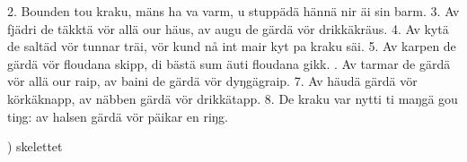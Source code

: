 \setlength{\columnsep}{0.2cm}
\begin{multicols}{2}
2.  Bounden tou kraku, mäns ha va varm,
    u stuppädä hännä nir äi sin barm.
3.  Av fjädri de täkktä vör allä our häus,
    av augu de gärdä vör drikkäkräus.
4.  Av kytä de saltäd vör tunnar träi,
    vör kund nå int mair kyt pa kraku säi.
5.  Av karpen de gärdä vör floudana skipp,
    di bästä sum äuti floudana gikk.
\vfill{}.  Av tarmar de gärdä vör allä our raip,
    av baini de gärdä vör dyŋgägraip.
7.  Av häudä gärdä vör körkäknapp,
    av näbben gärdä vör drikkätapp.
8.  De kraku var nytti ti maŋgä gou tiŋg:
    av halsen gärdä vör päikar en riŋg.
\end{multicols}
\vspace{2mm}
\tabto{0.2cm}) skelettet
